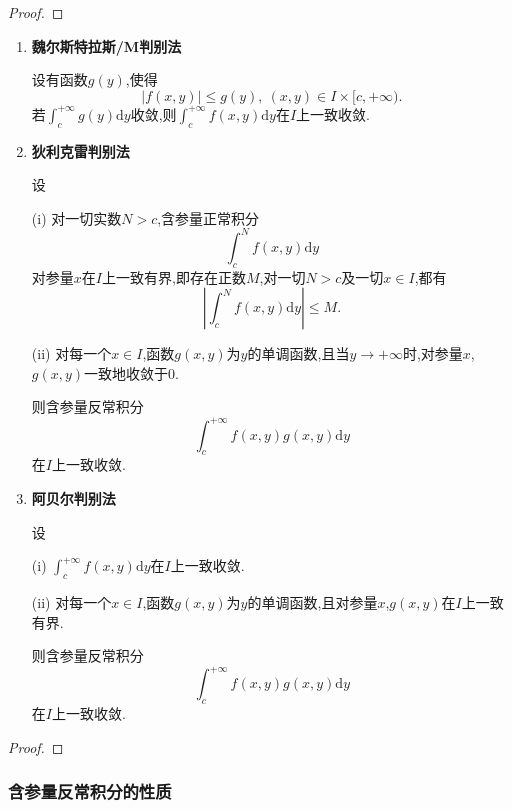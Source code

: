 \documentclass[../../main.tex]{subfiles}
\begin{document}
\begin{proof}
\end{proof}

\begin{theorem}[含参量反常积分一致收敛判别法]
\begin{enumerate}
\item \textbf{魏尔斯特拉斯/M判别法} 

设有函数$g(y)$,使得
\[
|f(x,y)| \leqslant g(y),\ (x,y) \in I \times [c, +\infty).
\]
若$\int_{c}^{+\infty} g(y)\mathrm{d}y$收敛,则$\int_{c}^{+\infty} f(x,y)\mathrm{d}y$在$I$上一致收敛.

\item \textbf{狄利克雷判别法} 

设

(i) 对一切实数$N > c$,含参量正常积分
\[
\int_{c}^{N} f(x,y)\mathrm{d}y
\]
对参量$x$在$I$上一致有界,即存在正数$M$,对一切$N > c$及一切$x \in I$,都有
\[
\left| \int_{c}^{N} f(x,y)\mathrm{d}y \right| \leqslant M.
\]

(ii) 对每一个$x \in I$,函数$g(x,y)$为$y$的单调函数,且当$y \to +\infty$时,对参量$x$,$g(x,y)$一致地收敛于0.

则含参量反常积分
\[
\int_{c}^{+\infty} f(x,y)g(x,y)\mathrm{d}y
\]
在$I$上一致收敛.

\item \textbf{阿贝尔判别法} 

设

(i) $\int_{c}^{+\infty} f(x,y)\mathrm{d}y$在$I$上一致收敛.

(ii) 对每一个$x \in I$,函数$g(x,y)$为$y$的单调函数,且对参量$x$,$g(x,y)$在$I$上一致有界.

则含参量反常积分
\[
\int_{c}^{+\infty} f(x,y)g(x,y)\mathrm{d}y
\]
在$I$上一致收敛.
\end{enumerate}
\end{theorem}
\begin{proof}


\end{proof}


\subsubsection{含参量反常积分的性质}
\end{document}
